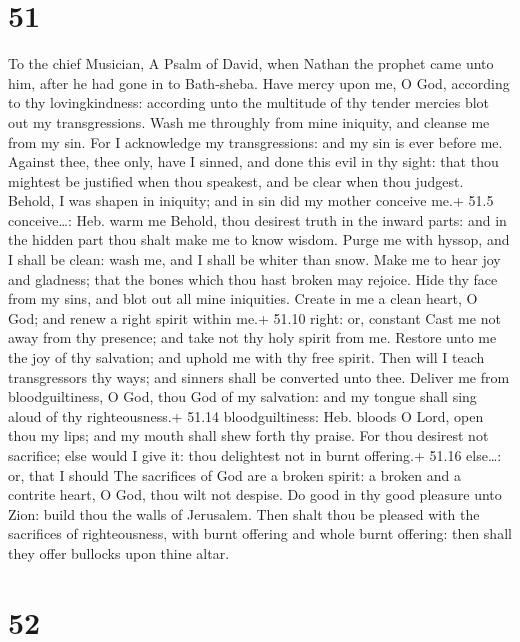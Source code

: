\hypertarget{section-50}{%
\section{51}\label{section-50}}

To the chief Musician, A Psalm of David, when Nathan the prophet came
unto him, after he had gone in to Bath-sheba.  Have mercy
upon me, O God, according to thy lovingkindness: according unto the
multitude of thy tender mercies blot out my transgressions. 
Wash me throughly from mine iniquity, and cleanse me from my sin.
 For I acknowledge my transgressions: and my sin is ever
before me.  Against thee, thee only, have I sinned, and done
this evil in thy sight: that thou mightest be justified when thou
speakest, and be clear when thou judgest.  Behold, I was
shapen in iniquity; and in sin did my mother conceive me.+ 51.5
conceive\ldots: Heb. warm me  Behold, thou desirest truth in
the inward parts: and in the hidden part thou shalt make me to know
wisdom.  Purge me with hyssop, and I shall be clean: wash
me, and I shall be whiter than snow.  Make me to hear joy
and gladness; that the bones which thou hast broken may rejoice.
 Hide thy face from my sins, and blot out all mine
iniquities.  Create in me a clean heart, O God; and renew a
right spirit within me.+ 51.10 right: or, constant  Cast me
not away from thy presence; and take not thy holy spirit from me.
 Restore unto me the joy of thy salvation; and uphold me
with thy free spirit.  Then will I teach transgressors thy
ways; and sinners shall be converted unto thee.  Deliver me
from bloodguiltiness, O God, thou God of my salvation: and my tongue
shall sing aloud of thy righteousness.+ 51.14 bloodguiltiness: Heb.
bloods  O Lord, open thou my lips; and my mouth shall shew
forth thy praise.  For thou desirest not sacrifice; else
would I give it: thou delightest not in burnt offering.+ 51.16
else\ldots: or, that I should  The sacrifices of God are a
broken spirit: a broken and a contrite heart, O God, thou wilt not
despise.  Do good in thy good pleasure unto Zion: build
thou the walls of Jerusalem.  Then shalt thou be pleased
with the sacrifices of righteousness, with burnt offering and whole
burnt offering: then shall they offer bullocks upon thine altar.

\hypertarget{section-51}{%
\section{52}\label{section-51}}

